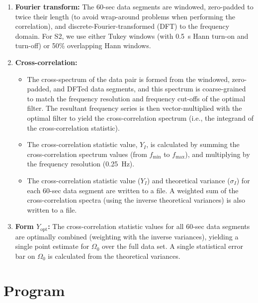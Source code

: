 \begin{enumerate}
\item \textbf{Fourier transform:}
The 60-sec data segments are windowed, zero-padded to twice their length
(to avoid wrap-around problems when performing the correlation), and
discrete-Fourier-transformed (DFT) to the frequency domain. For S2, we
use either Tukey windows (with 0.5~s Hann turn-on and turn-off) or 50\%
overlapping Hann windows.

\item \textbf{Cross-correlation:}
\begin{itemize}
\item The cross-spectrum of the data pair is formed from the windowed,
zero-padded, and DFTed data segments, and this spectrum is
coarse-grained to match the frequency resolution and frequency cut-offs
of the optimal filter. The resultant frequency series is then
vector-multiplied with the optimal filter to yield the cross-correlation
spectrum (i.e., the integrand of the cross-correlation statistic).
\item The cross-correlation statistic value, $Y_I$, is calculated by
summing the cross-correlation spectrum values (from $f_{\mathrm{min}}$ to
$f_{\mathrm{max}}$), and multiplying by the frequency resolution (0.25~Hz).
\item The cross-correlation statistic value ($Y_I$) and theoretical
variance ($\sigma_I$) for each 60-sec data segment are written to a
file. A weighted sum of the cross-correlation spectra (using the inverse
theoretical variances) is also written to a file.
\end{itemize}

\item \textbf{Form $Y_{\mathrm{opt}}$:}
The cross-correlation statistic values for all 60-sec data segments are
optimally combined (weighting with the inverse variances), yielding a
single point estimate for $\Omega_0$ over the full data set. A single
statistical error bar on $\Omega_0$ is calculated from the theoretical
variances.

\end{enumerate}

\clearpage
\section{Program }
\label{program:lalapps-stochastic-pipe}

